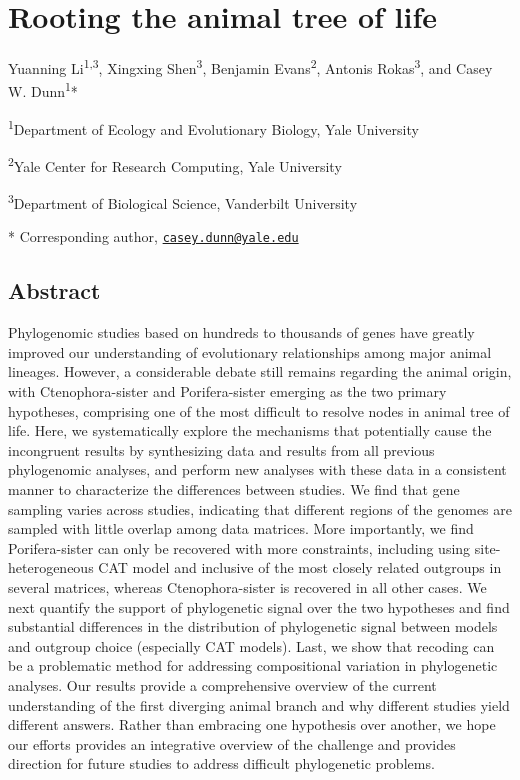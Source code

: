 \documentclass[]{article}
\title{}
\author{}
\date{}
\begin{document}
\hypertarget{rooting-the-animal-tree-of-life}{%
\section{Rooting the animal tree of
life}\label{rooting-the-animal-tree-of-life}}

Yuanning Li\textsuperscript{1,3}, Xingxing Shen\textsuperscript{3},
Benjamin Evans\textsuperscript{2}, Antonis Rokas\textsuperscript{3}, and
Casey W. Dunn\textsuperscript{1}*

\textsuperscript{1}Department of Ecology and Evolutionary Biology, Yale
University

\textsuperscript{2}Yale Center for Research Computing, Yale University

\textsuperscript{3}Department of Biological Science, Vanderbilt
University

* Corresponding author,
\href{mailto:casey.dunn@yale.edu}{\nolinkurl{casey.dunn@yale.edu}}

\hypertarget{abstract}{%
\subsection{Abstract}\label{abstract}}

Phylogenomic studies based on hundreds to thousands of genes have
greatly improved our understanding of evolutionary relationships among
major animal lineages. However, a considerable debate still remains
regarding the animal origin, with Ctenophora-sister and Porifera-sister
emerging as the two primary hypotheses, comprising one of the most
difficult to resolve nodes in animal tree of life. Here, we
systematically explore the mechanisms that potentially cause the
incongruent results by synthesizing data and results from all previous
phylogenomic analyses, and perform new analyses with these data in a
consistent manner to characterize the differences between studies. We
find that gene sampling varies across studies, indicating that different
regions of the genomes are sampled with little overlap among data
matrices. More importantly, we find Porifera-sister can only be
recovered with more constraints, including using site-heterogeneous CAT
model and inclusive of the most closely related outgroups in several
matrices, whereas Ctenophora-sister is recovered in all other cases. We
next quantify the support of phylogenetic signal over the two hypotheses
and find substantial differences in the distribution of phylogenetic
signal between models and outgroup choice (especially CAT models). Last,
we show that recoding can be a problematic method for addressing
compositional variation in phylogenetic analyses. Our results provide a
comprehensive overview of the current understanding of the first
diverging animal branch and why different studies yield different
answers. Rather than embracing one hypothesis over another, we hope our
efforts provides an integrative overview of the challenge and provides
direction for future studies to address difficult phylogenetic problems.
\end{document}

